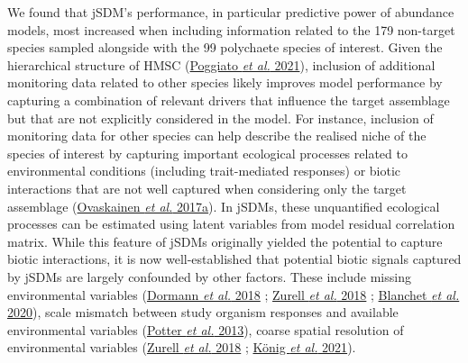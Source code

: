 \documentclass[9pt,biorxiv,doublespacing,lineno]{lapreprint}
\begin{document}
We found that jSDM's performance, in particular predictive power of
abundance models, most increased when including information related to
the 179 non-target species sampled alongside with the 99 polychaete
species of interest. Given the hierarchical structure of HMSC
(\protect\hyperlink{ref-Poggiato_2021}{Poggiato \emph{et al.} 2021}),
inclusion of additional monitoring data related to other species likely
improves model performance by capturing a combination of relevant
drivers that influence the target assemblage but that are not explicitly
considered in the model. For instance, inclusion of monitoring data for
other species can help describe the realised niche of the species of
interest by capturing important ecological processes related to
environmental conditions (including trait-mediated responses) or biotic
interactions that are not well captured when considering only the target
assemblage (\protect\hyperlink{ref-Ovaskainen_2017b}{Ovaskainen \emph{et
al.} 2017a}). In jSDMs, these unquantified ecological processes can be
estimated using latent variables from model residual correlation matrix.
While this feature of jSDMs originally yielded the potential to capture
biotic interactions, it is now well-established that potential biotic
signals captured by jSDMs are largely confounded by other factors. These
include missing environmental variables
(\protect\hyperlink{ref-Dormann_2018}{Dormann \emph{et al.} 2018} ;
\protect\hyperlink{ref-Zurell_2018}{Zurell \emph{et al.} 2018} ;
\protect\hyperlink{ref-Blanchet_2020}{Blanchet \emph{et al.} 2020}),
scale mismatch between study organism responses and available
environmental variables (\protect\hyperlink{ref-Potter_2013}{Potter
\emph{et al.} 2013}), coarse spatial resolution of environmental
variables (\protect\hyperlink{ref-Zurell_2018}{Zurell \emph{et al.}
2018} ; \protect\hyperlink{ref-Konig_2021}{König \emph{et al.} 2021}).
\end{document}
